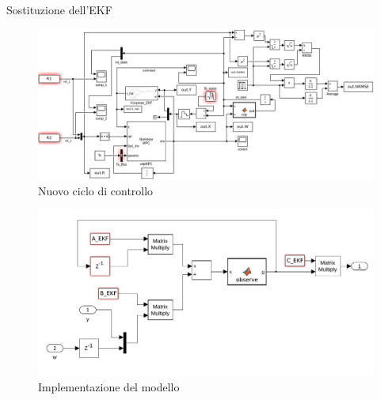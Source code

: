 \documentclass{beamer}
\begin{document}
\begin{frame}[allowframebreaks]{Sostituzione dell'EKF}
    \begin{figure}
        \centering
        \includegraphics[width=\textwidth]{Figures/Koopman_nlMPC.png}
        \caption{Nuovo ciclo di controllo}
    \end{figure}

    \begin{figure}
        \centering
        \includegraphics[width=\textwidth]{Figures/Koopman_Block.png}
        \caption{Implementazione del modello}
    \end{figure}
\end{frame}
\end{document}

